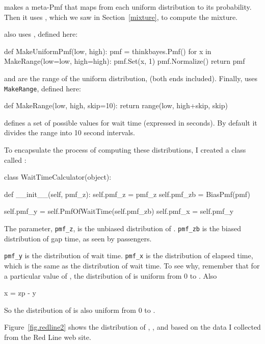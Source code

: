 \documentclass[12pt]{book}
\theoremstyle{exercise}
\begin{document}
 makes a meta-Pmf that maps from each uniform
distribution to its probability.  Then it uses ,
which we saw in Section~\ref{mixture}, to compute the mixture.

 also uses , defined here:

\begin{code}
def MakeUniformPmf(low, high):
    pmf = thinkbayes.Pmf()
    for x in MakeRange(low=low, high=high):
        pmf.Set(x, 1)
    pmf.Normalize()
    return pmf
\end{code}

 and  are the range of the uniform distribution,
(both ends included).  Finally,  uses {\tt
  MakeRange}, defined here:

\begin{code}
def MakeRange(low, high, skip=10):
    return range(low, high+skip, skip)
\end{code}

 defines a set of possible values for wait time
(expressed in seconds).  By default it divides the range into 
10 second intervals.

To encapsulate the process of computing these distributions, I
created a class called :

\begin{code}
class WaitTimeCalculator(object):

    def __init__(self, pmf_z):
        self.pmf_z = pmf_z
        self.pmf_zb = BiasPmf(pmf)

        self.pmf_y = self.PmfOfWaitTime(self.pmf_zb)
        self.pmf_x = self.pmf_y
\end{code}

The parameter, \verb"pmf_z", is the unbiased distribution of .
\verb"pmf_zb" is the biased distribution of gap time, as seen by
passengers.

\verb"pmf_y" is the distribution of wait time.  \verb"pmf_x" is the
distribution of elapsed time, which is the same as the distribution of
wait time.  To see why, remember that for a particular value of
, the distribution of  is uniform from 0 to .
Also
%
\begin{code}
x = zp - y
\end{code}
%
So the distribution of  is also uniform from 0 to .

Figure~\ref{fig.redline2} shows the distribution of , ,
and  based on the data I collected from the Red Line web site.
\end{document}
